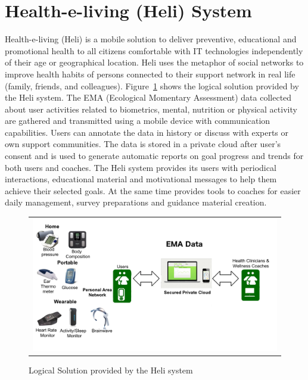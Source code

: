 \documentclass[graybox]{svmult}
\begin{document}
\section{Health-e-living (Heli) System}
\label{sec.heli}

 Health-e-living (Heli)\cite{rem2012} is a mobile solution to deliver preventive, educational and promotional health to all citizens comfortable with IT technologies independently of their age or geographical location. Heli uses the metaphor of social networks to improve health habits of persons connected to their support network in real life (family, friends, and colleagues). Figure~\ref{Fig.heli} shows the logical solution provided by the Heli system.
 The EMA  (Ecological Momentary Assessment) data collected about user activities related to biometrics, mental, nutrition or physical activity are gathered and transmitted using a mobile device with communication capabilities. Users can annotate the data in history or discuss with experts or own support communities. The data is stored in a private cloud after user's consent and is used to generate automatic reports on goal progress and trends for both users and coaches. 
 The Heli system provides its users with periodical interactions, educational material and motivational messages to help them achieve their selected goals. At the same time provides tools to coaches for easier daily management, survey preparations and guidance material creation.
 
\begin{figure}
  \begin{center}
  \begin{tabular}{c}
    \includegraphics[scale=0.5]{LogicalSolutionNow.png}\\
    \end{tabular}
    \caption{Logical Solution provided by the Heli system\cite{rem2012}}
     \label{Fig.heli}
\end{center}
\end{figure} 
\end{document}
